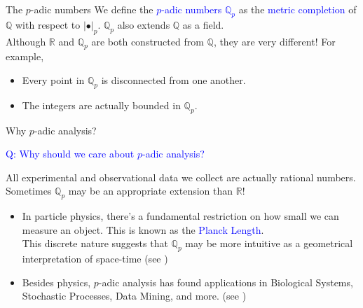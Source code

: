 \documentclass[hyperref, notheorems]{beamer}
\newcommand{\Rbb}{\mathbb{R}}
\newcommand{\Zbb}{\mathbb{Z}}
\newcommand{\Qbb}{\mathbb{Q}}
\newcommand{\txtblue}{\textcolor{blue}}
\theoremstyle{definition}
\begin{document}
\begin{frame}{The $p$-adic numbers}
We define the \txtblue{$p$-adic numbers $\Qbb_p$} as the \txtblue{metric completion} of $\Qbb$ with respect to $|\bullet|_p$. $\Qbb_p$ also extends $\Qbb$ as a field.\\
\vspace{\baselineskip}
Although $\Rbb$ and $\Qbb_p$ are both constructed from $\Qbb$, they are very different! For example,
\begin{itemize}
    \item Every point in $\Qbb_p$ is disconnected from one another.
    \item The integers are actually bounded in $\Qbb_p$.
\end{itemize}
\end{frame}

\begin{frame}{Why $p$-adic analysis?}

\txtblue{Q: Why should we care about $p$-adic analysis?}\\
\vspace{\baselineskip}

All experimental and observational data we collect are actually rational numbers. Sometimes $\Qbb_p$ may be an appropriate extension than $\Rbb$!
\begin{itemize}
    \item In particle physics, there's a fundamental restriction on how small we can measure an object. This is known as the \txtblue{Planck Length}.\\
    \vspace{\baselineskip}
    This discrete nature suggests that $\Qbb_p$ may be more intuitive as a geometrical interpretation of space-time (see \cite{volovich_1987})

    \item Besides physics, $p$-adic analysis has found applications in Biological Systems, Stochastic Processes, Data Mining, and more. (see \cite{dragovich_khrennikov_kozyrev_volovich_zelenov_2017})
\end{itemize}
\end{frame}
\end{document}
